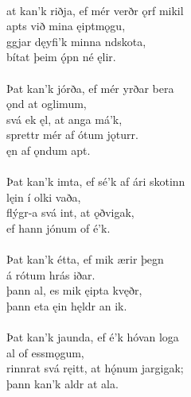  \\

\bva {}at kan'k riðja, \hld ef mér verðr ǫrf mikil \\%
\ind {}apts við mina ęiptmǫgu, \\%
ggjar dęyfi'k \hld minna ndskota, \\%
\ind bítat þeim ǫ́pn né ęlir.\\%

 \\

\bva Þat kan'k jórða, \hld ef mér yrðar bera \\%
\ind {}ǫnd at oglimum, \\%
svá ek ęl, \hld at anga má'k, \\%
\ind sprettr mér af ótum jǫturr. \\%
\ind ęn af ǫndum apt.\\%

 \\

\bva Þat kan'k imta, \hld ef sé'k af ári skotinn \\%
\ind {}lęin í olki vaða, \\%
flýgr-a svá int, \hld at ǫðvigak, \\%
\ind ef hann jónum of é'k.\\%

 \\

\bva Þat kan'k étta, \hld ef mik ærir þegn \\%
\ind á rótum hrás iðar. \\%
þann al, \hld es mik ęipta kvęðr, \\%
\ind þann eta ęin hęldr an ik.\\%

 \\

\bva Þat kan'k jaunda, \hld ef é'k hóvan loga \\%
\ind {}al of essmǫgum, \\%
rinnrat svá ręitt, \hld at hǫ́num jargigak; \\%
\ind þann kan'k aldr at ala.\\%

